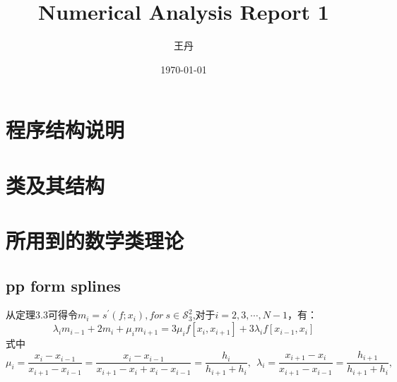 \documentclass[a4paper]{article}
\title{Numerical Analysis Report 1}
\author[1]{王丹}
\affil[1]{University, Email: \texttt{1901298538@tan.edu.cn}}
\date{\today}
\begin{document}
\maketitle

\section{程序结构说明}

\section{类及其结构}

\section{所用到的数学类理论}
\subsection{pp form splines}

从定理3.3可得令$m_i = s^\prime(f;x_i),for\ s\in \mathcal{S}_3^2$,对于$i=2,3,\cdots,N-1$，有：
\begin{equation}
    \lambda_i m_{i-1} +2m_i +\mu_i m_{i+1} = 3\mu_i f[x_i,x_{i+1}]+3\lambda_if[x_{i-1},x_i]
\end{equation}
式中
\begin{equation}
    \mu_i = \frac{x_i-x_{i-1}}{x_{i+1}-x_{i-1}}=\frac{x_i-x_{i-1}}{x_{i+1}-x_{i}+x_i-x_{i-1}} = \frac{h_i}{h_{i+1}+h_i}, \ \ \lambda_i = \frac{x_{i+1}-x_{i}}{x_{i+1}-x_{i-1}} = \frac{h_{i+1}}{h_{i+1}+h_i},
\end{equation}
\end{document}
